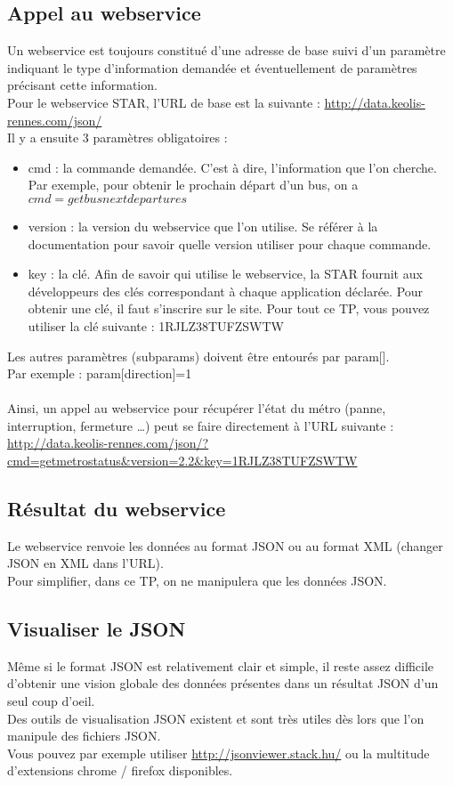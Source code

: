 \documentclass{article}
\begin{document}
\subsection{Appel au webservice}
Un webservice est toujours constitué d'une adresse de base suivi d'un paramètre
indiquant le type d'information demandée et éventuellement de paramètres
précisant cette information.\\
Pour le webservice STAR, l'URL de base est la suivante : 
\href{http://data.keolis-rennes.com/json/}{http://data.keolis-rennes.com/json/}\\
Il y a ensuite 3 paramètres obligatoires :
\begin{itemize}
  \item cmd : la commande demandée. C'est à dire, l'information que l'on
  cherche. Par exemple, pour obtenir le prochain départ d'un bus, on a
  $cmd=getbusnextdepartures$
  \item version : la version du webservice que l'on utilise. Se référer à la
  documentation pour savoir quelle version utiliser pour chaque commande. 
  \item key : la clé. Afin de savoir qui utilise le webservice, la STAR fournit
  aux développeurs des clés correspondant à chaque application déclarée. Pour
  obtenir une clé, il faut s'inscrire sur le site. Pour tout ce TP, vous pouvez
  utiliser la clé suivante : 1RJLZ38TUFZSWTW
\end{itemize}
Les autres paramètres (subparams) doivent être entourés par param[].
\\Par exemple : param[direction]=1
\\\\Ainsi, un appel au webservice pour récupérer l'état du métro (panne,
interruption, fermeture \ldots) peut se faire directement à l'URL suivante :\\
\href{http://data.keolis-rennes.com/json/?cmd=getmetrostatus&version=2.2&key=1RJLZ38TUFZSWTW}{http://data.keolis-rennes.com/json/?cmd=getmetrostatus\&version=2.2\&key=1RJLZ38TUFZSWTW}
\subsection{Résultat du webservice}
Le webservice renvoie les données au format JSON ou au format XML (changer
JSON en XML dans l'URL).\\
Pour simplifier, dans ce TP, on ne manipulera que les données JSON.
\subsection{Visualiser le JSON} 
Même si le format JSON est relativement clair et simple, il reste assez
difficile d'obtenir une vision globale des données présentes dans un résultat JSON d'un seul coup d'oeil.\\
Des outils de visualisation JSON existent et sont très utiles dès lors que l'on
manipule des fichiers JSON.\\
Vous pouvez par exemple utiliser
\href{http://jsonviewer.stack.hu/}{http://jsonviewer.stack.hu/} ou la multitude
d'extensions chrome / firefox disponibles.
\end{document}
